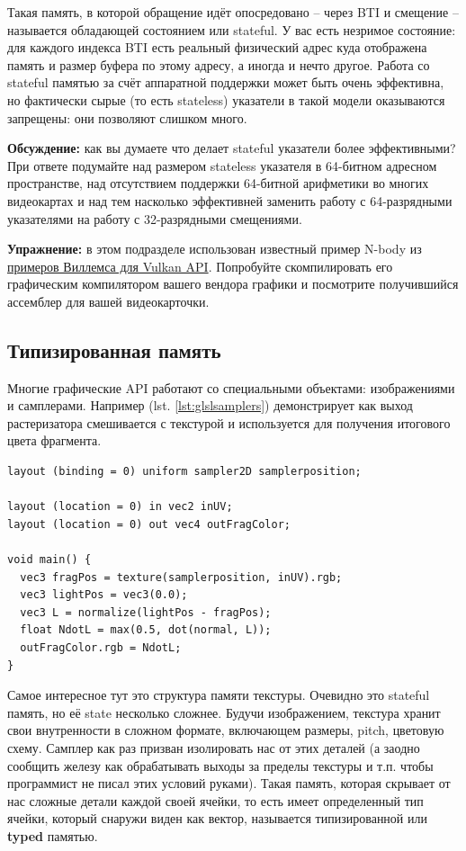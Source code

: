 \documentclass[a4paper,12pt,oneside]{article}
\begin{document}
Такая память, в которой обращение идёт опосредовано -- через BTI и смещение -- называется обладающей состоянием или stateful.
У вас есть незримое состояние: для каждого индекса BTI есть реальный физический адрес куда отображена память и размер буфера по этому адресу, а иногда и нечто другое.
Работа со stateful памятью за счёт аппаратной поддержки может быть очень эффективна, но фактически сырые (то есть stateless) указатели в такой модели оказываются запрещены: они позволяют слишком много.

\textbf{Обсуждение:} как вы думаете что делает stateful указатели более эффективными?
При ответе подумайте над размером stateless указателя в 64-битном адресном пространстве, над отсутствием поддержки 64-битной арифметики во многих видеокартах и над тем насколько эффективней заменить работу с 64-разрядными указателями на работу с 32-разрядными смещениями.

\textbf{Упражнение:} в этом подразделе использован известный пример N-body из
\href{https://github.com/SaschaWillems/Vulkan/blob/master/data/shaders/glsl/computenbody/particle_calculate.comp}{примеров Виллемса для Vulkan API}. Попробуйте скомпилировать его графическим компилятором вашего вендора графики и посмотрите получившийся ассемблер для вашей видеокарточки.

\subsection{Типизированная память}\label{subsec:typedmem}

Многие графические API работают со специальными объектами: изображениями и самплерами. Например (lst. \ref{lst:glslsamplers}) демонстрирует как выход растеризатора смешивается с текстурой и используется для получения итогового цвета фрагмента.

\begin{lstlisting}[caption={Работа с typed памятью},label={lst:glslsamplers}]
layout (binding = 0) uniform sampler2D samplerposition;

layout (location = 0) in vec2 inUV;
layout (location = 0) out vec4 outFragColor;

void main() {
  vec3 fragPos = texture(samplerposition, inUV).rgb;
  vec3 lightPos = vec3(0.0);
  vec3 L = normalize(lightPos - fragPos);
  float NdotL = max(0.5, dot(normal, L));
  outFragColor.rgb = NdotL;
}
\end{lstlisting}

Самое интересное тут это структура памяти текстуры. Очевидно это stateful память, но её state несколько сложнее.
Будучи изображением, текстура хранит свои внутренности в сложном формате, включающем размеры, pitch, цветовую схему.
Самплер как раз призван изолировать нас от этих деталей (а заодно сообщить железу как обрабатывать выходы за пределы текстуры и т.п. чтобы программист не писал этих условий руками).
Такая память, которая скрывает от нас сложные детали каждой своей ячейки, то есть имеет определенный тип ячейки, который снаружи виден как вектор, называется типизированной или \textbf{typed} памятью.
\end{document}
